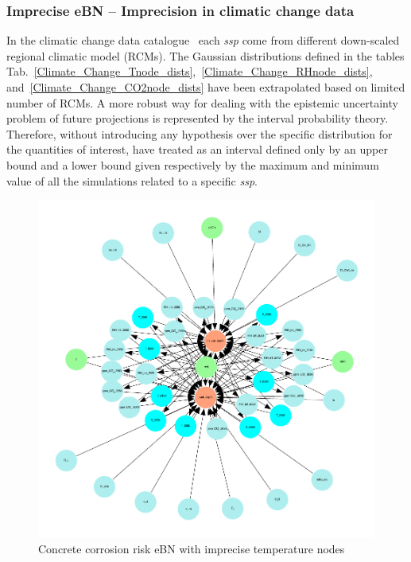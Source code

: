 \subsubsection{Imprecise eBN -- Imprecision in climatic change data}

In the climatic change data catalogue~\cite{Copernicus_Climate_Change}  each \textit{ssp} come from different down-scaled regional climatic model (RCMs). The Gaussian distributions defined in the tables Tab.~\ref{Climate_Change_Tnode_dists},~\ref{Climate_Change_RHnode_dists}, and~\ref{Climate_Change_CO2node_dists} have been extrapolated based on limited number of RCMs.
A more robust way for dealing with the epistemic uncertainty problem of future projections is represented by the interval probability theory. Therefore, without introducing any hypothesis over the specific distribution for the quantities of interest, have treated as an interval defined only by an upper bound and a lower bound given respectively by the maximum and minimum value of all the simulations related to a specific \textit{ssp}.

\begin{figure}[H]
    \centering
    \includegraphics[width=\linewidth]{imgs/pdfs/14_total_ebn_imprecise.pdf}
    \caption{Concrete corrosion risk eBN with imprecise temperature nodes}\label{fig:imprecise_ebn}
\end{figure}

